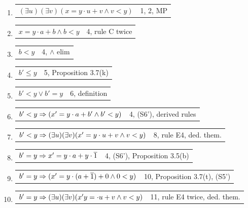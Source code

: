 \begin{enumerate} [label = \roman*.]
\begin{enumerate} [label = \arabic*.]
\begin{tabular}{p{8cm} r}
            \end{tabular}
        \item \begin{tabular}{p{8cm} r}
            $(\exists u )(\exists v)(x = y \cdot u + v \land v < y)$ & 1, 2, MP
            \end{tabular}
        \item \begin{tabular}{p{8cm} r}
            $x=y \cdot a + b \land b < y$ & 4, rule C twice
            \end{tabular}
        \item \begin{tabular}{p{8cm} r}
            $b <y$ & 4, $\land$ elim
            \end{tabular}
        \item \begin{tabular}{p{8cm} r}
            $b' \leq y$ & 5, Proposition 3.7(k)
            \end{tabular}
        \item \begin{tabular}{p{8cm} r}
            $b' < y \lor b' = y$ & 6, definition
            \end{tabular}
        \item \begin{tabular}{p{8cm} r}
            $b' < y \Rightarrow (x'=y \cdot a + b' \land b' < y)$ & 4, (S6'), derived rules
            \end{tabular}
        \item \begin{tabular}{p{8cm} r}
            $b' < y \Rightarrow (\exists u)(\exists v)(x' = y \cdot u + v \land v < y)$ & 8, rule E4, ded. them.
            \end{tabular}
        \item \begin{tabular}{p{8cm} r}
            $b' = y \Rightarrow x' = y \cdot a + y\cdot \overline{1}$ & 4, (S6'), Proposition 3.5(b)
            \end{tabular}
        \item \begin{tabular}{p{8cm} r}
            $b' = y \Rightarrow (x' = y \cdot (a + \overline{1}) + 0 \land 0 < y)$ & 10, Proposition 3.7(t), (S5')
            \end{tabular}
        \item \begin{tabular}{p{8cm} r}
            $b' = y \Rightarrow (\exists u)(\exists v)(x'y= \cdot u + v \land v <y)$ & 11, rule E4 twice, ded. them.

\end{tabular}
\end{enumerate}
\end{enumerate}
